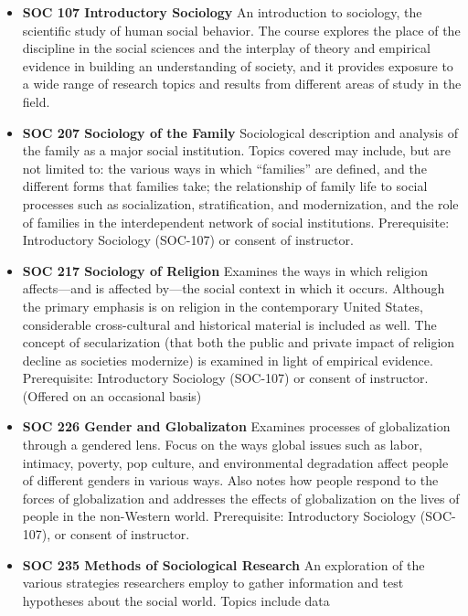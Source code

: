 \documentclass[
  letterpaper,
]{scrbook}
\providecommand{\tightlist}{%
  \setlength{\itemsep}{0pt}\setlength{\parskip}{0pt}}
\begin{document}
\begin{itemize}
\tightlist
\item
  \textbf{SOC 107 Introductory Sociology} An introduction to sociology,
  the scientific study of human social behavior. The course explores the
  place of the discipline in the social sciences and the interplay of
  theory and empirical evidence in building an understanding of society,
  and it provides exposure to a wide range of research topics and
  results from different areas of study in the field.\\
\item
  \textbf{SOC 207 Sociology of the Family} Sociological description and
  analysis of the family as a major social institution. Topics covered
  may include, but are not limited to: the various ways in which
  ``families'' are defined, and the different forms that families take;
  the relationship of family life to social processes such as
  socialization, stratification, and modernization, and the role of
  families in the interdependent network of social institutions.
  Prerequisite: Introductory Sociology (SOC-107) or consent of
  instructor.
\item
  \textbf{SOC 217 Sociology of Religion} Examines the ways in which
  religion affects---and is affected by---the social context in which it
  occurs. Although the primary emphasis is on religion in the
  contemporary United States, considerable cross-cultural and historical
  material is included as well. The concept of secularization (that both
  the public and private impact of religion decline as societies
  modernize) is examined in light of empirical evidence. Prerequisite:
  Introductory Sociology (SOC-107) or consent of instructor. (Offered on
  an occasional basis)\\
\item
  \textbf{SOC 226 Gender and Globalizaton} Examines processes of
  globalization through a gendered lens. Focus on the ways global issues
  such as labor, intimacy, poverty, pop culture, and environmental
  degradation affect people of different genders in various ways. Also
  notes how people respond to the forces of globalization and addresses
  the effects of globalization on the lives of people in the non-Western
  world. Prerequisite: Introductory Sociology (SOC-107), or consent of
  instructor.
\item
  \textbf{SOC 235 Methods of Sociological Research} An exploration of
  the various strategies researchers employ to gather information and
  test hypotheses about the social world. Topics include data

\end{itemize}
\end{document}
